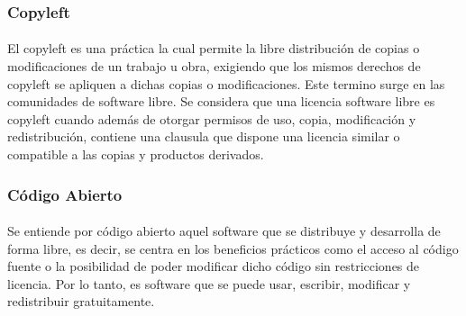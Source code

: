 \documentclass[10pt]{article}
\begin{document}
            \subsubsection{Copyleft}
            \paragraph{}
            El copyleft es una práctica la cual permite la libre distribución de copias o modificaciones de un trabajo u obra, exigiendo que los mismos derechos de copyleft se apliquen a dichas copias o modificaciones. Este termino surge en las comunidades de software libre. Se considera que una licencia software libre es copyleft cuando además de otorgar permisos de uso, copia, modificación y redistribución, contiene una clausula que dispone una licencia similar o compatible a las copias y productos derivados.\cite{Wikipedia:Copyleft}
            
            \subsubsection{Código Abierto}
            \paragraph{}
            Se entiende por código abierto aquel software que se distribuye y desarrolla de forma libre, es decir, se centra en los beneficios prácticos como el acceso al código fuente o la posibilidad de poder modificar dicho código sin restricciones de licencia. Por lo tanto, es software que se puede usar, escribir, modificar y redistribuir gratuitamente.\cite{Wikipedia:CodigoAbierto}
\end{document}
